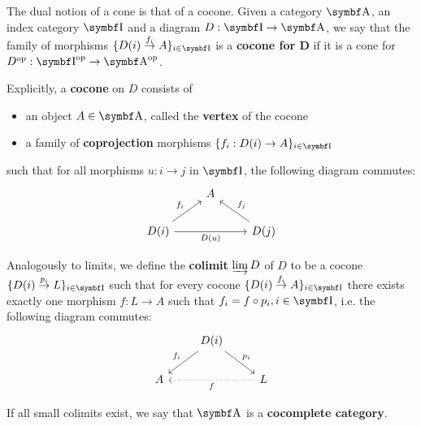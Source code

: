\begin{definition}\label{def:categorical_cocone}\cite[definition 5.2.1]{Leinster2014}
  The dual notion of a cone is that of a cocone. Given a category \( \Bold A \), an index category \( \Bold I \) and a diagram \( D: \Bold I \to \Bold A \), we say that the family of morphisms \( \{ D(i) \overset {f_i} \to A \}_{i \in \Bold I} \) is a \textbf{cocone for D} if it is a cone for \( D^{\Op}: \Bold{I}^{\Op} \to \Bold{A}^{\Op} \).

  Explicitly, a \textbf{cocone} on \( D \) consists of
  \begin{itemize}
    \item an object \( A \in \Bold A \), called the \textbf{vertex} of the cocone
    \item a family of \textbf{coprojection} morphisms \( \{ f_i: D(i) \to A \}_{i \in \Bold I} \)
  \end{itemize}
  such that for all morphisms \( u: i \to j \) in \( \Bold I \), the following diagram commutes:
  \begin{equation*}
    \begin{tikzcd}
      & A & \\
      D(i) \arrow[ru, "f_i"] \arrow[rr, "D(u)"'] & & D(j) \arrow[lu, "f_j"']
    \end{tikzcd}
  \end{equation*}
\end{definition}

\begin{definition}\label{def:categorical_colimit}\cite[definition 5.1.19(b)]{Leinster2014}
  Analogously to limits, we define the \textbf{colimit} \( \varinjlim D \) of \( D \) to be a cocone \( \{ D(i) \overset {p_i} \to L \}_{i \in \Bold I} \) such that for every cocone \( \{ D(i) \overset {f_i} \to A \}_{i \in \Bold I} \) there exists exactly one morphism \( f: L \to A \) such that \( f_i = f \circ p_i, i \in \Bold I \), i.e. the following diagram commutes:
  \begin{equation*}
    \begin{tikzcd}
        & D(i) \arrow[rd, "p_i"] \arrow[ld, "f_i"'] & \\
      A &                                           & L \arrow[ll, "f", dotted]
    \end{tikzcd}
  \end{equation*}

  If all small colimits exist, we say that \( \Bold A \) is a \textbf{cocomplete category}.
\end{definition}

